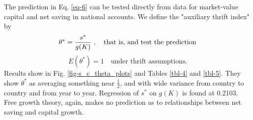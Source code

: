 \documentclass[a4paper,fleqn]{latex_styles/cas-sc}
\begin{document}
The prediction in Eq. \eqref{eq-6} can be tested directly from data for market-value capital and net saving in national accounts. We define the "auxiliary thrift index" by 
%
\begin{equation*}
    \theta^* = \frac{s^*}{g(K)}\ , \quad \text{that is, and test the prediction} \\
\end{equation*}
%
\begin{equation*}
    E(\theta^*) = 1 \quad \text{under thrift assumptions.}
\end{equation*}
%
Results show in Fig. \ref{fig-s_c_theta_plots} and Tables \ref{tbl-4} and \ref{tbl-5}. They show \(\theta^*\) as averaging something near \(\frac{1}{2}\), and with wide variance from country to country and from year to year.
Regression of \(s^*\) on \(g(K)\) is found at 0.2103.
Free growth theory, again, makes no prediction as to relationships between net saving and capital growth.
\end{document}
